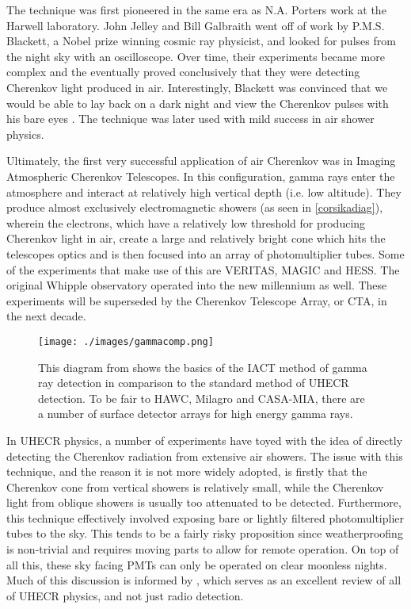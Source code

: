 The technique was first pioneered in the same era as N.A. Porters work at the Harwell laboratory. John Jelley and Bill Galbraith went off of work by P.M.S. Blackett, a Nobel prize winning cosmic ray physicist, and looked for pulses from the night sky with an oscilloscope. Over time, their experiments became more complex and the eventually proved conclusively that they were detecting Cherenkov light produced in air. Interestingly, Blackett was convinced that we would be able to lay back on a dark night and view the Cherenkov pulses with his bare eyes \cite{firstcher}. The technique was later used with mild success in air shower physics.

Ultimately, the first very successful application of air Cherenkov was in Imaging Atmospheric Cherenkov Telescopes. In this configuration, gamma rays enter the atmosphere and interact at relatively high vertical depth (i.e. low altitude). They produce almost exclusively electromagnetic showers (as seen in \autoref{corsikadiag}), wherein the electrons, which have a relatively low threshold for producing Cherenkov light in air, create a large and relatively bright cone which hits the telescopes optics and is then focused into an array of photomultiplier tubes. Some of the experiments that make use of this are VERITAS, MAGIC and HESS. The original Whipple observatory operated into the new millennium as well. These experiments will be superseded by the Cherenkov Telescope Array, or CTA, in the next decade.

\begin{figure}[h!]
\begin{center}
\texttt{[image: ./images/gammacomp.png]}
\caption[Comparison of UHECR and VHE Gamma Ray Detectors]{This diagram from \textcite{ultraray} shows the basics of the IACT method of gamma ray detection in comparison to the standard method of UHECR detection. To be fair to HAWC, Milagro and CASA-MIA, there are a number of surface detector arrays for high energy gamma rays.}
\label{gammacomp}
\end{center}
\end{figure}

In UHECR physics, a number of experiments have toyed with the idea of directly detecting the Cherenkov radiation from extensive air showers. The issue with this technique, and the reason it is not more widely adopted, is firstly that the Cherenkov cone from vertical showers is relatively small, while the Cherenkov light from oblique showers is usually too attenuated to be detected. Furthermore, this technique effectively involved exposing bare or lightly filtered photomultiplier tubes to the sky. This tends to be a fairly risky proposition since weatherproofing is non-trivial and requires moving parts to allow for remote operation. On top of all this, these sky facing PMTs can only be operated on clear moonless nights. Much of this discussion is informed by \textcite{schroeder}, which serves as an excellent review of all of UHECR physics, and not just radio detection. 

